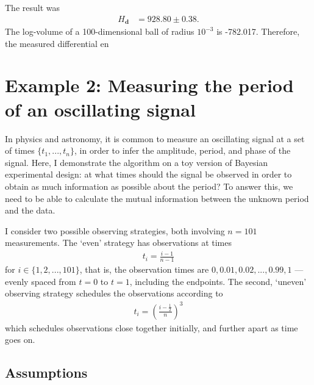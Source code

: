 \documentclass[entropy,article,accept,oneauthor,pdftex,10pt,a4paper]{mdpi}
\renewcommand{\d}{\boldsymbol{d}}
\begin{document}
The result was
\begin{align}
H_{\d} &= 928.80 \pm 0.38.
\end{align}
The log-volume of a 100-dimensional ball of radius $10^{-3}$ is
-782.017. Therefore, the measured differential en
\section{Example 2: Measuring the period of an oscillating signal}

In physics and astronomy, it is common to measure an oscillating signal
at a set of times $\{t_1, ..., t_n\}$, in order to infer the amplitude,
period, and phase of the signal.
Here, I demonstrate the algorithm on a toy version
of Bayesian experimental design: at what times should the signal be
observed in order to obtain as much information as possible about the
period? To answer this, we need to be able to calculate the mutual
information between the unknown period and the data.

I consider two possible observing strategies, both involving
$n=101$ measurements. The `even' strategy has observations at times
\begin{align}
t_i = \frac{i-1}{n-1}
\end{align}
for $i \in \{1, 2, ..., 101\}$, that is, the observation times are
$0, 0.01, 0.02, ..., 0.99, 1$ ---
evenly spaced from $t=0$ to $t=1$, including the endpoints.
The second, `uneven' observing strategy schedules the observations
according to
\begin{align}
t_i = \left(\frac{i - \frac{1}{2}}{n}\right)^3
\end{align}
which schedules observations close together initially, and further apart
as time goes on.

\subsection{Assumptions}
\end{document}
